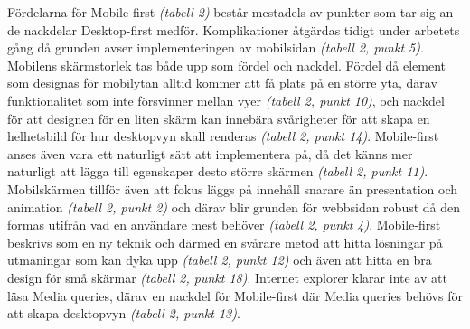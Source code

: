 \documentclass[11pt]{article}
\begin{document}
Fördelarna för Mobile-first \textit{(tabell 2)} består mestadels av punkter som tar sig an de nackdelar Desktop-first medför. Komplikationer åtgärdas tidigt under arbetets gång då grunden avser implementeringen av mobilsidan \textit{(tabell 2, punkt 5)}. Mobilens skärmstorlek tas både upp som fördel och nackdel. Fördel då element som designas för mobilytan alltid kommer att få plats på en större yta, därav funktionalitet som inte försvinner mellan vyer \textit{(tabell 2, punkt 10)}, och nackdel för att designen för en liten skärm kan innebära svårigheter för att skapa en helhetsbild för hur desktopvyn skall renderas \textit{(tabell 2, punkt 14)}. Mobile-first anses även vara ett naturligt sätt att implementera på, då det känns mer naturligt att lägga till egenskaper desto större skärmen \textit{(tabell 2, punkt 11)}. Mobilskärmen tillför även att fokus läggs på innehåll snarare än presentation och animation \textit{(tabell 2, punkt 2)} och därav blir grunden för webbsidan robust då den formas utifrån vad en användare mest behöver \textit{(tabell 2, punkt 4)}. Mobile-first beskrivs som en ny teknik och därmed en svårare metod att hitta lösningar på utmaningar som kan dyka upp \textit{(tabell 2, punkt 12)} och även att hitta en bra design för små skärmar \textit{(tabell 2, punkt 18)}. Internet explorer klarar inte av att läsa Media queries, därav en nackdel för Mobile-first där Media queries behövs för att skapa desktopvyn \textit{(tabell 2, punkt 13)}.\\
\end{document}
